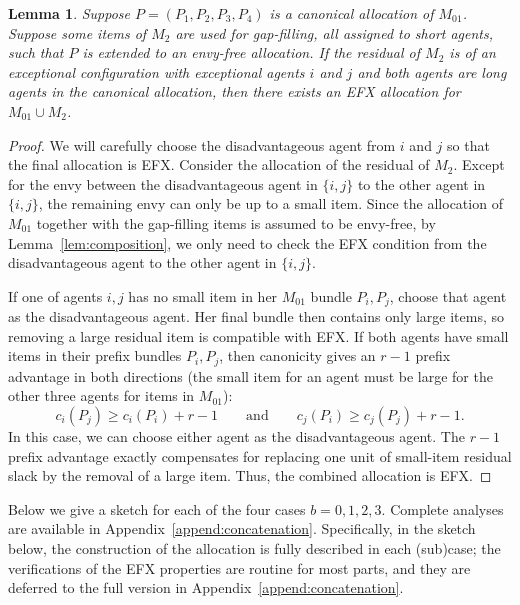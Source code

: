 \documentclass{article}
\newtheorem{lemma}{Lemma}
\theoremstyle{definition}
\begin{document}
\begin{lemma}\label{lem:easycombine}
    Suppose $P=(P_1,P_2,P_3,P_4)$ is a canonical allocation of $M_{01}$. Suppose some items of \(M_2\) are used for gap-filling, all assigned to short agents, such that \(P\) is extended to an envy-free allocation.
    If the residual of $M_2$ is of an exceptional configuration with exceptional agents $i$ and $j$ and both agents are long agents in the canonical allocation, then there exists an EFX allocation for $M_{01}\cup M_2$.
\end{lemma}
\begin{proof}
    We will carefully choose the disadvantageous agent from $i$ and $j$ so that the final allocation is EFX.
    Consider the allocation of the residual of $M_2$.
    Except for the envy between the disadvantageous agent in $\{i,j\}$ to the other agent in $\{i,j\}$, the remaining envy can only be up to a small item.
    Since the allocation of $M_{01}$ together with the gap-filling items is assumed to be envy-free, by Lemma~\ref{lem:composition}, we only need to check the EFX condition from the disadvantageous agent to the other agent in $\{i,j\}$.

    If one of agents $i,j$ has no small item in her $M_{01}$ bundle $P_i,P_j$,
    choose that agent as the disadvantageous agent.  Her final bundle then contains only large items, so removing a large residual item is compatible with EFX.  
    If both agents have small items in their prefix bundles $P_i,P_j$, then canonicity gives an $r-1$ prefix advantage in both directions (the small item for an agent must be large for the other three agents for items in $M_{01}$):
    \[
     c_i(P_j)\ge c_i(P_i)+r-1
     \qquad\text{and}\qquad
     c_j(P_i)\ge c_j(P_j)+r-1.
    \]
    In this case, we can choose either agent as the disadvantageous agent.
    The $r-1$ prefix advantage exactly compensates for replacing one unit of small-item residual slack by the removal of a large item.  Thus, the combined
    allocation is EFX.
\end{proof}

Below we give a sketch for each of the four cases $b=0,1,2,3$. Complete analyses are available in Appendix~\ref{append:concatenation}. Specifically, in the sketch below, the construction of the allocation is fully described in each (sub)case; the verifications of the EFX properties are routine for most parts, and they are deferred to the full version in Appendix~\ref{append:concatenation}.
\end{document}
